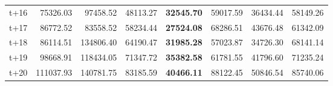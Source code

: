 \begin{table}[H]
\begin{tabular}{lrrrrrrr}
t+16  & 75326.03  & 97458.52  & 48113.27  & \textbf{32545.70}  & 59017.59  & 36434.44  & 58149.26  \\
t+17  & 86772.52  & 83558.52  & 58234.44  & \textbf{27524.08}  & 68286.51  & 43676.48  & 61342.09  \\
t+18  & 86114.51  & 134806.40  & 64190.47  & \textbf{31985.28}  & 57023.87  & 34726.30  & 68141.14  \\
t+19  & 98668.91  & 118434.05  & 71347.72  & \textbf{35382.58}  & 61781.55  & 41796.60  & 71235.24  \\
t+20  & 111037.93  & 140781.75  & 83185.59  & \textbf{40466.11}  & 88122.45  & 50846.54  & 85740.06  \\

\bottomrule
\end{tabular}
\end{table}
